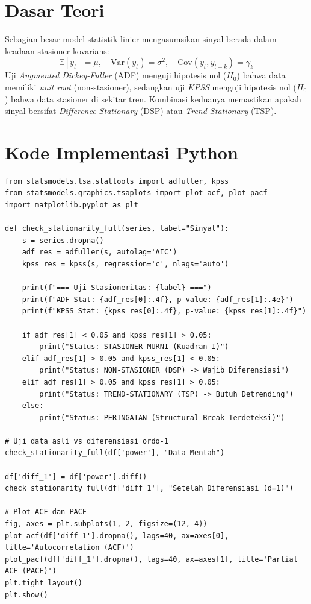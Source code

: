 \documentclass[11pt,a4paper]{report}
\begin{document}
\section{Dasar Teori}
Sebagian besar model statistik linier mengasumsikan sinyal berada dalam keadaan stasioner kovarians:
\begin{equation}
    \mathbb{E}[y_t] = \mu, \quad \mathrm{Var}(y_t) = \sigma^2, \quad \mathrm{Cov}(y_t, y_{t-k}) = \gamma_k
\end{equation}
Uji \textit{Augmented Dickey-Fuller} (ADF) menguji hipotesis nol ($H_0$) bahwa data memiliki \textit{unit root} (non-stasioner), sedangkan uji \textit{KPSS} menguji hipotesis nol ($H_0$) bahwa data stasioner di sekitar tren. Kombinasi keduanya memastikan apakah sinyal bersifat \textit{Difference-Stationary} (DSP) atau \textit{Trend-Stationary} (TSP).

\section{Kode Implementasi Python}
\begin{lstlisting}
from statsmodels.tsa.stattools import adfuller, kpss
from statsmodels.graphics.tsaplots import plot_acf, plot_pacf
import matplotlib.pyplot as plt

def check_stationarity_full(series, label="Sinyal"):
    s = series.dropna()
    adf_res = adfuller(s, autolag='AIC')
    kpss_res = kpss(s, regression='c', nlags='auto')
    
    print(f"=== Uji Stasioneritas: {label} ===")
    print(f"ADF Stat: {adf_res[0]:.4f}, p-value: {adf_res[1]:.4e}")
    print(f"KPSS Stat: {kpss_res[0]:.4f}, p-value: {kpss_res[1]:.4f}")
    
    if adf_res[1] < 0.05 and kpss_res[1] > 0.05:
        print("Status: STASIONER MURNI (Kuadran I)")
    elif adf_res[1] > 0.05 and kpss_res[1] < 0.05:
        print("Status: NON-STASIONER (DSP) -> Wajib Diferensiasi")
    elif adf_res[1] > 0.05 and kpss_res[1] > 0.05:
        print("Status: TREND-STATIONARY (TSP) -> Butuh Detrending")
    else:
        print("Status: PERINGATAN (Structural Break Terdeteksi)")

# Uji data asli vs diferensiasi ordo-1
check_stationarity_full(df['power'], "Data Mentah")

df['diff_1'] = df['power'].diff()
check_stationarity_full(df['diff_1'], "Setelah Diferensiasi (d=1)")

# Plot ACF dan PACF
fig, axes = plt.subplots(1, 2, figsize=(12, 4))
plot_acf(df['diff_1'].dropna(), lags=40, ax=axes[0], title='Autocorrelation (ACF)')
plot_pacf(df['diff_1'].dropna(), lags=40, ax=axes[1], title='Partial ACF (PACF)')
plt.tight_layout()
plt.show()
\end{lstlisting}
\end{document}
